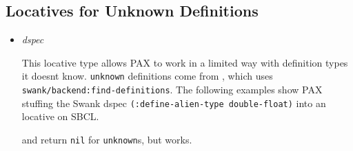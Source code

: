 \subsection{Locatives for Unknown
Definitions}\label{locatives-for-unknown-definitions}

\label{x-28DREF-3A-40UNKNOWN-DEFINITIONS-20MGL-PAX-3ASECTION-29}

\begin{itemize}
\item
  \label{x-28MGL-PAX-3AUNKNOWN-20MGL-PAX-3ALOCATIVE-29}
  \emph{dspec}

  This locative type allows PAX to work in a limited way with definition
  types it doesn\textquotesingle t know. \texttt{unknown} definitions
  come from
  ,
  which uses \texttt{swank/backend:find-definitions}. The following
  examples show PAX stuffing the Swank dspec
  \texttt{(:define-alien-type\ double-float)} into an
  locative on SBCL.

\begin{Shaded}
\begin{Highlighting}[]
\NormalTok{)}
\OperatorTok{\textgreater{}}\NormalTok{)}
\end{Highlighting}
\end{Shaded}

\begin{Shaded}
\begin{Highlighting}[]
\NormalTok{)))}
\OperatorTok{\textgreater{}}
\end{Highlighting}
\end{Shaded}

   and
  return \texttt{nil} for \texttt{unknown}s, but
  works.
\end{itemize}

